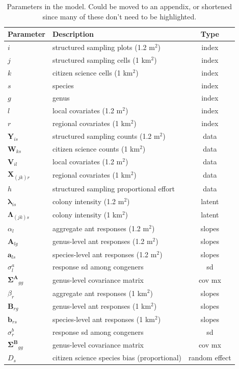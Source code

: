 \documentclass[preprint,review,times,12pt]{elsarticle}
\begin{document}
\begin{table}[ht]
	\centering
	\begin{tabular}{ l l c }
		\hline
		\textbf{Parameter} & \textbf{Description} & \textbf{Type} \\
		\hline
		$i$ & structured sampling plots (1.2 m$^2$) & index \\
		$j$ & structured sampling cells (1 km$^2$) & index \\
		$k$ & citizen science cells (1 km$^2$) & index \\
		$s$ & species & index \\
		$g$ & genus & index \\
		$l$ & local covariates (1.2 m$^2$) & index \\
		$r$ & regional covariates (1 km$^2$) & index \\
		\hline
		$\mathbf{Y}_{is}$ & structured sampling counts (1.2 m$^2$) & data \\
		$\mathbf{W}_{ks}$ & citizen science counts (1 km$^2$) & data \\
		$\mathbf{V}_{il}$ & local covariates (1.2 m$^2$) & data \\
		$\mathbf{X}_{(jk)r}$ & regional covariates (1 km$^2$) & data \\
		$h$ & structured sampling proportional effort & data \\
		\hline
		$\mathbf{\lambda}_{is}$ & colony intensity (1.2 m$^2$) & latent \\
		$\mathbf{\Lambda}_{(jk)s}$ & colony intensity (1 km$^2$) & latent \\
		\hline
		$\alpha_{l}$ & aggregate ant responses (1.2 m$^2$) & slopes \\
		$\mathbf{A}_{lg}$ & genus-level ant responses (1.2 m$^2$) & slopes \\
		$\mathbf{a}_{ls}$ & species-level ant responses (1.2 m$^2$) & slopes \\
		$\sigma^a_{l}$ & response sd among congeners & sd \\
		$\mathbf{\Sigma^A}_{gg}$ & genus-level covariance matrix & cov mx \\
		$\beta_{r}$ & aggregate ant responses (1 km$^2$) & slopes \\
		$\mathbf{B}_{rg}$ & genus-level ant responses (1 km$^2$) & slopes \\
		$\mathbf{b}_{rs}$ & species-level ant responses (1 km$^2$) & slopes \\
		$\sigma^b_{r}$ & response sd among congeners & sd \\
		$\mathbf{\Sigma^B}_{gg}$ & genus-level covariance matrix & cov mx \\
		$D_{s}$ & citizen science species bias (proportional) & random effect \\
	\end{tabular}
	\caption{\label{table:params} Parameters in the model. Could be moved to an appendix, or shortened since many of these don't need to be highlighted. }
\end{table}
\end{document}
